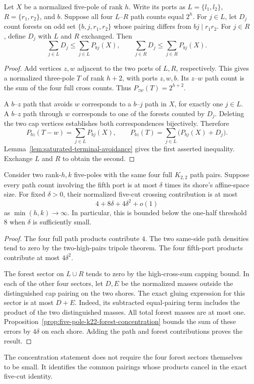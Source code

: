 \begin{proposition}
\label{prop:five-pole-k22-forest-concentration}
Let $X$ be a normalized five-pole of rank $h$.
Write its ports as $L=\{l_1,l_2\}$, $R=\{r_1,r_2\}$, and $b$.
Suppose all four $L$--$R$ path counts equal $2^h$.
For $j\in L$, let $D_j$ count forests on odd set $\{b,j,r_1,r_2\}$ whose pairing differs from $bj\mid r_1r_2$.
For $j\in R$, define $D_j$ with $L$ and $R$ exchanged.
Then
\[
 \sum_{j\in L}D_j\le\sum_{j\in L}P_{bj}(X),\qquad
 \sum_{j\in R}D_j\le\sum_{j\in R}P_{bj}(X).
\]
\end{proposition}

\begin{proof}
Add vertices $z,w$ adjacent to the two ports of $L,R$, respectively.
This gives a normalized three-pole $T$ of rank $h+2$, with ports $z,w,b$.
Its $z$--$w$ path count is the sum of the four full cross counts.
Thus $P_{zw}(T)=2^{h+2}$.

A $b$--$z$ path that avoids $w$ corresponds to a $b$--$j$ path in $X$, for exactly one $j\in L$.
A $b$--$z$ path through $w$ corresponds to one of the forests counted by $D_j$.
Deleting the two cap vertices establishes both correspondences bijectively.
Therefore
\[
 P_{bz}(T-w)=\sum_{j\in L}P_{bj}(X),\qquad
 P_{bz}(T)=\sum_{j\in L}\bigl(P_{bj}(X)+D_j\bigr).
\]
Lemma~\ref{lem:saturated-terminal-avoidance} gives the first asserted inequality.
Exchange $L$ and $R$ to obtain the second.
\end{proof}

\begin{corollary}
\label{cor:five-pole-k22-isolate-deficit}
Consider two rank-$h,k$ five-poles with the same four full $K_{2,2}$ path pairs.
Suppose every path count involving the fifth port is at most $\delta$ times its shore's affine-space size.
For fixed $\delta>0$, their normalized five-cut crossing contribution is at most
\[
 4+8\delta+4\delta^2+o(1)
\]
as $\min(h,k)\longrightarrow\infty$.
In particular, this is bounded below the one-half threshold $8$ when $\delta$ is sufficiently small.
\end{corollary}

\begin{proof}
The four full path products contribute $4$.
The two same-side path densities tend to zero by the two-high-pairs tripole theorem.
The four fifth-port products contribute at most $4\delta^2$.

The forest sector on $L\cup R$ tends to zero by the high-cross-sum capping bound.
In each of the other four sectors, let $D,E$ be the normalized masses outside the distinguished cap pairing on the two shores.
The exact gluing expression for this sector is at most $D+E$.
Indeed, its subtracted equal-pairing term includes the product of the two distinguished masses.
All total forest masses are at most one.
Proposition~\ref{prop:five-pole-k22-forest-concentration} bounds the sum of these errors by $4\delta$ on each shore.
Adding the path and forest contributions proves the result.
\end{proof}

The concentration statement does not require the four forest sectors themselves to be small.
It identifies the common pairings whose products cancel in the exact five-cut identity.

